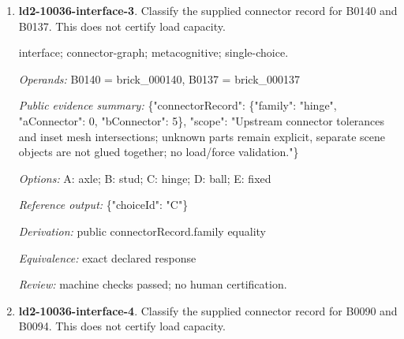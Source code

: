 \begin{enumerate}
\par{\small interface; connector-graph; metacognitive; single-choice.\par\textit{Operands:} B0127 = brick\_000127, B0128 = brick\_000128\par\textit{Public evidence summary:} \{"connectorRecord": \{"family": "fixed", "aConnector": 2, "bConnector": 0\}, "scope": "Upstream connector tolerances and inset mesh intersections; unknown parts remain explicit, separate scene objects are not glued together; no load/force validation."\}\par\textit{Options:} A: ball; B: axle; C: hinge; D: stud; E: fixed\par\textit{Reference output:} \{"choiceId": "E"\}\par\textit{Derivation:} public connectorRecord.family equality\par\textit{Equivalence:} exact declared response\par\textit{Review:} machine checks passed; no human certification.}
\item \textbf{ld2-10036-interface-3}. Classify the supplied connector record for B0140 and B0137. This does not certify load capacity.
\par{\small interface; connector-graph; metacognitive; single-choice.\par\textit{Operands:} B0140 = brick\_000140, B0137 = brick\_000137\par\textit{Public evidence summary:} \{"connectorRecord": \{"family": "hinge", "aConnector": 0, "bConnector": 5\}, "scope": "Upstream connector tolerances and inset mesh intersections; unknown parts remain explicit, separate scene objects are not glued together; no load/force validation."\}\par\textit{Options:} A: axle; B: stud; C: hinge; D: ball; E: fixed\par\textit{Reference output:} \{"choiceId": "C"\}\par\textit{Derivation:} public connectorRecord.family equality\par\textit{Equivalence:} exact declared response\par\textit{Review:} machine checks passed; no human certification.}
\item \textbf{ld2-10036-interface-4}. Classify the supplied connector record for B0090 and B0094. This does not certify load capacity.

\end{enumerate}
